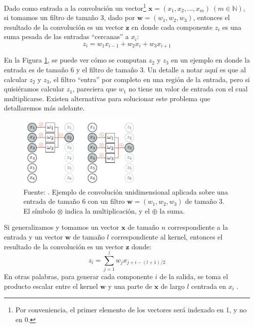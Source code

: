 \documentclass[../../main.tex]{subfiles}
\begin{document}
Dado como entrada a la convolución un vector\footnote{Por conveniencia, el primer elemento
de los vectores será indexado en 1, y no en 0.} \(\bm{x} = (x_1, x_2, ..., x_m)\ (m \in
\mathbb{N})\), si tomamos un filtro de tamaño 3, dado por \(\bm{w}=(w_1, w_2, w_3)\),
entonces el resultado de la convolución es un vector \(\bm{z}\) en donde cada componente
\(z_i\) es una suma pesada de las entradas ``cercanas'' a \(x_i\):
\[z_i = w_1 x_{i-1} + w_2 x_{i} + w_3 x_{i+1}\]


En la Figura \ref{fig:conv1d-example}, se puede ver cómo se computan \(z_2\) y \(z_3\) en
un ejemplo en donde la entrada es de tamaño 6 y el filtro de tamaño 3. Un detalle a notar
aquí es que al calcular \(z_2\) y \(z_3\), el filtro ``entra'' por completo en una región
de la entrada, pero si quisiéramos calcular \(z_1\), pareciera que \(w_1\) no tiene un
valor de entrada con el cual multiplicarse. Existen alternativas para solucionar este
problema que detallaremos más adelante.

\begin{figure}
    \centering
    \includegraphics[width=0.55\textwidth]{figs/conv1d-example1.png}
    \caption{Fuente: \cite{prince2024understanding}. Ejemplo de convolución unidimensional
    aplicada sobre una entrada de tamaño 6 con un filtro \(\bm{w} = (w_1, w_2, w_3)\) de
    tamaño 3. El símbolo \(\otimes\) indica la multiplicación, y el \(\oplus\) la suma.}
    \label{fig:conv1d-example}
\end{figure}

Si generalizamos y tomamos un vector \(\bm{x}\) de tamaño \(n\) correspondiente
a la entrada y un vector \(\bm{w}\) de tamaño \(l\) correspondiente al kernel,
entonces el resultado de la convolución es un vector \(\bm{z}\) donde:
\begin{equation}
    z_i = \sum_{j=1}^l w_j x_{j+i-(l+1)/2}
    \label{eq:convolution}
\end{equation}
En otras palabras, para generar cada componente \(i\) de la salida, se toma el producto
escalar entre el kernel \(\bm{w}\) y una parte de \(\bm{x}\) de largo \(l\) centrada en
\(x_i\) \cite{ai-a-modern-approach}.
\end{document}
